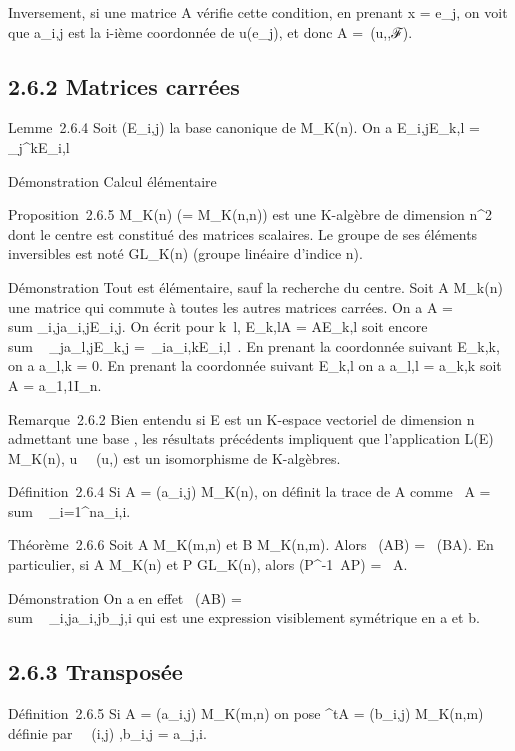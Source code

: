 \documentclass[]{article}
\begin{document}
Inversement, si une matrice A vérifie cette condition, en prenant x =
e_j, on voit que a_i,j est la i-ième coordonnée de
u(e_j), et donc A =\
\mathrmMat (u,,ℱ).

\subsection{2.6.2 Matrices carrées}

Lemme~2.6.4 Soit (E_i,j) la base canonique de M_K(n).
On a E_i,jE_k,l = \delta_j^kE_i,l

Démonstration Calcul élémentaire

Proposition~2.6.5 M_K(n) (= M_K(n,n)) est une
K-algèbre de dimension n^2 dont le centre est constitué des
matrices scalaires. Le groupe de ses éléments inversibles est noté
GL_K(n) (groupe linéaire d'indice n).

Démonstration Tout est élémentaire, sauf la recherche du centre. Soit A
\in M_k(n) une matrice qui commute à toutes les autres matrices
carrées. On a A =\ \\sum
 _i,ja_i,jE_i,j. On écrit pour
k\neq~l, E_k,lA = AE_k,l soit
encore \\sum ~
_ja_l,jE_k,j =\
\sum  _ia_i,kE_i,l~. En
prenant la coordonnée suivant E_k,k, on a a_l,k = 0.
En prenant la coordonnée suivant E_k,l on a a_l,l =
a_k,k soit A = a_1,1I_n.

Remarque~2.6.2 Bien entendu si E est un K-espace vectoriel de dimension
n admettant une base , les résultats précédents impliquent que
l'application L(E) \rightarrow~ M_K(n),
u\mapsto~\mathrmMat~
(u,\mathcal{E}) est un isomorphisme de K-algèbres.

Définition~2.6.4 Si A = (a_i,j) \in M_K(n), on définit
la trace de A comme
~A
= \\sum ~
_i=1^na_i,i.

Théorème~2.6.6 Soit A \in M_K(m,n) et B \in M_K(n,m).
Alors ~(AB)
= ~(BA). En
particulier, si A \in M_K(n) et P \in GL_K(n), alors
\mathrm{tr}(P^-1~AP)
= \mathrm{tr}~A.

Démonstration On a en effet
~(AB)
= \\sum ~
_i,ja_i,jb_j,i qui est une expression
visiblement symétrique en a et b.

\subsection{2.6.3 Transposée}

Définition~2.6.5 Si A = (a_i,j) \in M_K(m,n) on pose
^tA = (b_i,j) \in M_K(n,m) définie par
\forall~~(i,j) \in [1,n] \times
[1,m],\quad b_i,j = a_j,i.
\end{document}
